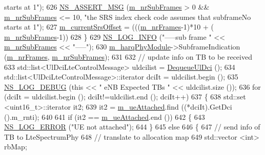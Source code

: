 \begin{DoxyCode}
{       starts at 1"});
626       \hyperlink{assert_8h_aff5ece9066c74e681e74999856f08539}{NS\_ASSERT\_MSG} (\hyperlink{classns3_1_1LteEnbPhy_a21c4d540ccd4813df02001a5e0159a35}{m\_nrSubFrames} > 0 && 
      \hyperlink{classns3_1_1LteEnbPhy_a21c4d540ccd4813df02001a5e0159a35}{m\_nrSubFrames} <= 10, \textcolor{stringliteral}{"the SRS index check code assumes that subframeNo starts at 1"});
627       \hyperlink{classns3_1_1LteEnbPhy_a8356f950997d27723f4997ddb797e589}{m\_currentSrsOffset} = (((\hyperlink{classns3_1_1LteEnbPhy_ae8464d0dff85be592774739e81f28942}{m\_nrFrames}-1)*10 + (
      \hyperlink{classns3_1_1LteEnbPhy_a21c4d540ccd4813df02001a5e0159a35}{m\_nrSubFrames}-1)) %
628     \}
629   \hyperlink{group__logging_gafbd73ee2cf9f26b319f49086d8e860fb}{NS\_LOG\_INFO} (\textcolor{stringliteral}{"-----sub frame "} << \hyperlink{classns3_1_1LteEnbPhy_a21c4d540ccd4813df02001a5e0159a35}{m\_nrSubFrames} << \textcolor{stringliteral}{"-----"});
630   \hyperlink{classns3_1_1LteEnbPhy_af1e6a57f81f6fcc0f670aa81131447ce}{m\_harqPhyModule}->SubframeIndication (\hyperlink{classns3_1_1LteEnbPhy_ae8464d0dff85be592774739e81f28942}{m\_nrFrames}, 
      \hyperlink{classns3_1_1LteEnbPhy_a21c4d540ccd4813df02001a5e0159a35}{m\_nrSubFrames});
631 
632   \textcolor{comment}{// update info on TB to be received}
633   std::list<UlDciLteControlMessage> uldcilist = \hyperlink{classns3_1_1LteEnbPhy_a6b0208f63caa33d708db8f457008b632}{DequeueUlDci} ();
634   std::list<UlDciLteControlMessage>::iterator dciIt = uldcilist.begin ();
635   \hyperlink{group__logging_ga413f1886406d49f59a6a0a89b77b4d0a}{NS\_LOG\_DEBUG} (\textcolor{keyword}{this} << \textcolor{stringliteral}{" eNB Expected TBs "} << uldcilist.size ());
636   \textcolor{keywordflow}{for} (dciIt = uldcilist.begin (); dciIt!=uldcilist.end (); dciIt++)
637     \{
638       std::set <uint16\_t>::iterator it2;
639       it2 = \hyperlink{classns3_1_1LteEnbPhy_a226e8d8e856ac3b90d45db11bbe23400}{m\_ueAttached}.find ((*dciIt).GetDci ().m\_rnti);
640 
641       \textcolor{keywordflow}{if} (it2 == \hyperlink{classns3_1_1LteEnbPhy_a226e8d8e856ac3b90d45db11bbe23400}{m\_ueAttached}.end ())
642         \{
643           \hyperlink{group__logging_ga0261a8db1d4ac5f79417d117634fd455}{NS\_LOG\_ERROR} (\textcolor{stringliteral}{"UE not attached"});
644         \}
645       \textcolor{keywordflow}{else}
646         \{
647           \textcolor{comment}{// send info of TB to LteSpectrumPhy }
648           \textcolor{comment}{// translate to allocation map}
649           std::vector <int> rbMap;

\end{DoxyCode}
